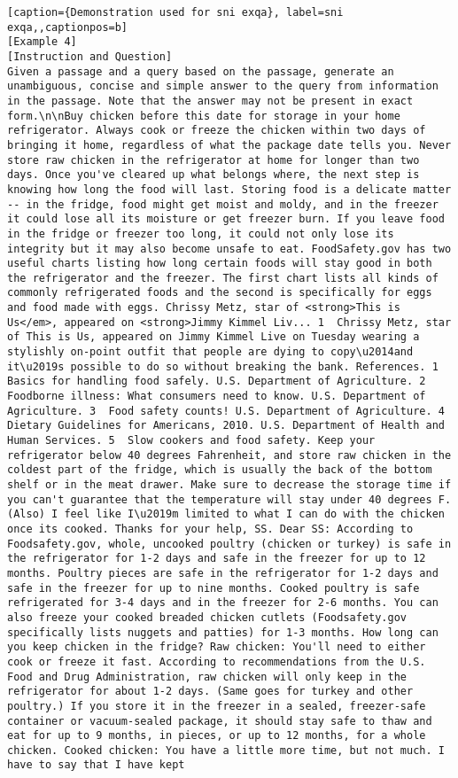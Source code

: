 \begin{lstlisting}[caption={Demonstration used for sni exqa}, label=sni exqa,,captionpos=b]
[Example 4]
[Instruction and Question]
Given a passage and a query based on the passage, generate an unambiguous, concise and simple answer to the query from information in the passage. Note that the answer may not be present in exact form.\n\nBuy chicken before this date for storage in your home refrigerator. Always cook or freeze the chicken within two days of bringing it home, regardless of what the package date tells you. Never store raw chicken in the refrigerator at home for longer than two days. Once you've cleared up what belongs where, the next step is knowing how long the food will last. Storing food is a delicate matter -- in the fridge, food might get moist and moldy, and in the freezer it could lose all its moisture or get freezer burn. If you leave food in the fridge or freezer too long, it could not only lose its integrity but it may also become unsafe to eat. FoodSafety.gov has two useful charts listing how long certain foods will stay good in both the refrigerator and the freezer. The first chart lists all kinds of commonly refrigerated foods and the second is specifically for eggs and food made with eggs. Chrissy Metz, star of <strong>This is Us</em>, appeared on <strong>Jimmy Kimmel Liv... 1  Chrissy Metz, star of This is Us, appeared on Jimmy Kimmel Live on Tuesday wearing a stylishly on-point outfit that people are dying to copy\u2014and it\u2019s possible to do so without breaking the bank. References. 1  Basics for handling food safely. U.S. Department of Agriculture. 2  Foodborne illness: What consumers need to know. U.S. Department of Agriculture. 3  Food safety counts! U.S. Department of Agriculture. 4  Dietary Guidelines for Americans, 2010. U.S. Department of Health and Human Services. 5  Slow cookers and food safety. Keep your refrigerator below 40 degrees Fahrenheit, and store raw chicken in the coldest part of the fridge, which is usually the back of the bottom shelf or in the meat drawer. Make sure to decrease the storage time if you can't guarantee that the temperature will stay under 40 degrees F. (Also) I feel like I\u2019m limited to what I can do with the chicken once its cooked. Thanks for your help, SS. Dear SS: According to Foodsafety.gov, whole, uncooked poultry (chicken or turkey) is safe in the refrigerator for 1-2 days and safe in the freezer for up to 12 months. Poultry pieces are safe in the refrigerator for 1-2 days and safe in the freezer for up to nine months. Cooked poultry is safe refrigerated for 3-4 days and in the freezer for 2-6 months. You can also freeze your cooked breaded chicken cutlets (Foodsafety.gov specifically lists nuggets and patties) for 1-3 months. How long can you keep chicken in the fridge? Raw chicken: You'll need to either cook or freeze it fast. According to recommendations from the U.S. Food and Drug Administration, raw chicken will only keep in the refrigerator for about 1-2 days. (Same goes for turkey and other poultry.) If you store it in the freezer in a sealed, freezer-safe container or vacuum-sealed package, it should stay safe to thaw and eat for up to 9 months, in pieces, or up to 12 months, for a whole chicken. Cooked chicken: You have a little more time, but not much. I have to say that I have kept 
\end{lstlisting}
